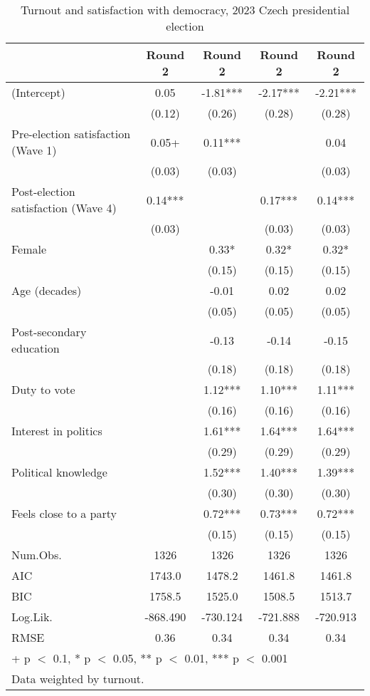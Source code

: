 \begin{table}

\caption{Turnout and satisfaction with democracy, 2023 Czech presidential election}
\centering
\begin{tabular}[t]{lcccc}
\toprule
  & Round 2 & Round 2  & Round 2   & Round 2   \\
\midrule
(Intercept) & 0.05 & -1.81*** & -2.17*** & -2.21***\\
 & (0.12) & (0.26) & (0.28) & (0.28)\\
Pre-election satisfaction (Wave 1) & 0.05+ & 0.11*** &  & 0.04\\
 & (0.03) & (0.03) &  & (0.03)\\
Post-election satisfaction (Wave 4) & 0.14*** &  & 0.17*** & 0.14***\\
 & (0.03) &  & (0.03) & (0.03)\\
Female &  & 0.33* & 0.32* & 0.32*\\
 &  & (0.15) & (0.15) & \vphantom{1} (0.15)\\
Age (decades) &  & -0.01 & 0.02 & 0.02\\
 &  & (0.05) & (0.05) & (0.05)\\
Post-secondary education &  & -0.13 & -0.14 & -0.15\\
 &  & (0.18) & (0.18) & (0.18)\\
Duty to vote &  & 1.12*** & 1.10*** & 1.11***\\
 &  & (0.16) & (0.16) & (0.16)\\
Interest in politics &  & 1.61*** & 1.64*** & 1.64***\\
 &  & (0.29) & (0.29) & (0.29)\\
Political knowledge &  & 1.52*** & 1.40*** & 1.39***\\
 &  & (0.30) & (0.30) & (0.30)\\
Feels close to a party &  & 0.72*** & 0.73*** & 0.72***\\
 &  & (0.15) & (0.15) & (0.15)\\
\midrule
Num.Obs. & 1326 & 1326 & 1326 & 1326\\
AIC & 1743.0 & 1478.2 & 1461.8 & 1461.8\\
BIC & 1758.5 & 1525.0 & 1508.5 & 1513.7\\
Log.Lik. & -868.490 & -730.124 & -721.888 & -720.913\\
RMSE & 0.36 & 0.34 & 0.34 & 0.34\\
\bottomrule
\multicolumn{5}{l}{\rule{0pt}{1em}+ p $<$ 0.1, * p $<$ 0.05, ** p $<$ 0.01, *** p $<$ 0.001}\\
\multicolumn{5}{l}{\rule{0pt}{1em}Data weighted by turnout.}\\
\end{tabular}
\end{table}
